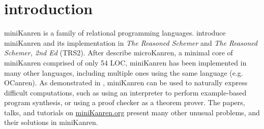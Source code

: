 \documentclass[format=acmlarge, review=false, authordraft=false]{acmart}
\begin{document}
\maketitle

\section{introduction}

miniKanren is a family of relational programming languages.
\citet{Friedman:2005:RS:1121583,friedman_reasoned_2018} introduce
miniKanren and its implementation in \emph{The Reasoned Schemer} 
and \emph{The Reasoned Schemer, 2nd Ed} (TRS2). After \mbox{\citet{Hemann_2016}}
describe microKanren, a minimal core of miniKanren comprised of only 54 LOC, 
miniKanren has been implemented in many other languages, including
multiple ones using the same language (e.g. OCanren\citep{kosarev2018typed}). 
As demonstrated in \citet{byrd2017unified}, miniKanren can be used to
naturally express difficult computations, such as using an interpreter
to perform example-based program synthesis, or using a proof checker
as a theorem prover.
The papers, talks, and tutorials on \url{miniKanren.org} present many
other unusual problems, and their solutions in miniKanren.

\end{document}
